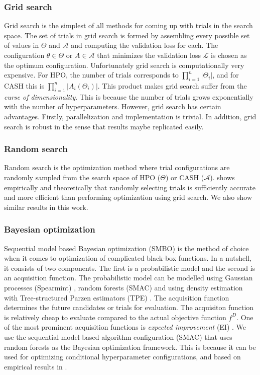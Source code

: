 \subsubsection{Grid search}
\label{subsubsec1}
Grid search is the simplest of all methods for coming up with trials in the search space. The set of trials in grid search is formed by assembling every possible set of values in $\Theta$ and $\mathcal{A}$ and computing the validation loss for each. The configuration $\theta \in \Theta$ or $A \in \mathcal{A}$ that minimizes the validation loss $\mathcal{L}$ is chosen as the optimum configuration. Unfortunately grid search is computationally very expensive. For HPO, the number of trials corresponds to $\prod_{i=1}^n |\Theta_i|$, and for CASH this is $\prod_{i=1}^n |A_i(\Theta_i)|$. This product makes grid search suffer from the \textit{curse of dimensionality}. This is because the number of trials grows exponentially with the number of hyperparameters. However, grid search has certain advantages. Firstly, parallelization and implementation is trivial. In addition, grid search is robust in the sense that results maybe replicated easily. 

\subsubsection{Random search}
\label{subsubsec2}
Random search is the optimization method where trial configurations are randomly sampled from the search space of HPO ($\Theta$) or CASH ($\mathcal{A}$). \cite{bergstra2012random} shows empirically and theoretically that randomly selecting trials is sufficiently accurate and more efficient than performing optimization using grid search. We also show similar results in this work.

\subsubsection{Bayesian optimization}
\label{subsubsec1}
Sequential model based Bayesian optimization (SMBO) \cite{hutter2011sequential} is the method of choice when it comes to optimization of complicated black-box functions. In a nutshell, it consists of two components. The first is a probabilistic model and the second is an acquisition function. The probabilistic model can be modelled using Gaussian processes (Spearmint) \cite{snoek2012practical}, random forests (SMAC) \cite{hutter2011sequential} and using density estimation with Tree-structured Parzen estimators (TPE) \cite{bergstra2011algorithms}. The acquisition function determines the future candidates or trials for evaluation. The acquisiton function is relatively cheap to evaluate compared to the actual objective function $f^D$. One of the most prominent acquisition functions is \textit{expected improvement} (EI) \cite{expected_improvement}. We use the sequential model-based algorithm configuration (SMAC) that uses random forests as the Bayesian optimization framework. This is because it can be used for optimizing conditional hyperparameter configurations, and based on empirical results in \cite{eggensperger2013towards}.

